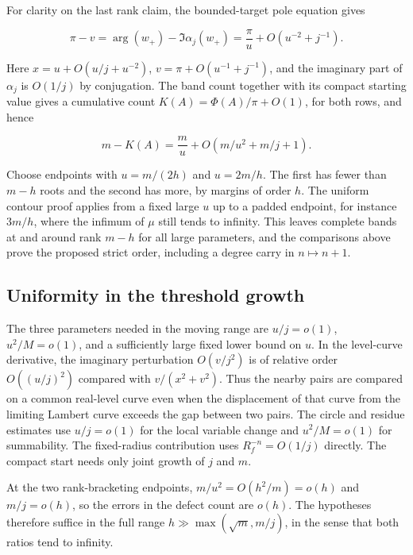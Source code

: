 \documentclass[11pt]{article}
\begin{document}
For clarity on the last rank claim, the bounded-target pole equation gives

\begin{equation*}
\pi-v=\arg(w_+)-\Im\alpha_j(w_+)=\frac{\pi}{u}+O(u^{-2}+j^{-1}).
\end{equation*}

Here \(x=u+O(u/j+u^{-2})\), \(v=\pi+O(u^{-1}+j^{-1})\), and the imaginary part of \(\alpha_j\) is \(O(1/j)\) by conjugation. The band count together with its compact starting value gives a cumulative count \(K(A)=\Phi(A)/\pi+O(1)\), for both rows, and hence

\begin{equation*}
m-K(A)=\frac m u+O(m/u^2+m/j+1).
\end{equation*}

Choose endpoints with \(u=m/(2h)\) and \(u=2m/h\). The first has fewer than \(m-h\) roots and the second has more, by margins of order \(h\). The uniform contour proof applies from a fixed large \(u\) up to a padded endpoint, for instance \(3m/h\), where the infimum of \(\mu\) still tends to infinity. This leaves complete bands at and around rank \(m-h\) for all large parameters, and the comparisons above prove the proposed strict order, including a degree carry in \(n\mapsto n+1\).

\subsection{Uniformity in the threshold growth}
\label{sec:uniformity-in-the-threshold-growth}

The three parameters needed in the moving range are \(u/j=o(1)\), \(u^2/M=o(1)\), and a sufficiently large fixed lower bound on \(u\). In the level-curve derivative, the imaginary perturbation \(O(v/j^2)\) is of relative order \(O((u/j)^2)\) compared with \(v/(x^2+v^2)\). Thus the nearby pairs are compared on a common real-level curve even when the displacement of that curve from the limiting Lambert curve exceeds the gap between two pairs. The circle and residue estimates use \(u/j=o(1)\) for the local variable change and \(u^2/M=o(1)\) for summability. The fixed-radius contribution uses \(R_f^{-n}=O(1/j)\) directly. The compact start needs only joint growth of \(j\) and \(m\).

At the two rank-bracketing endpoints, \(m/u^2=O(h^2/m)=o(h)\) and \(m/j=o(h)\), so the errors in the defect count are \(o(h)\). The hypotheses therefore suffice in the full range \(h\gg\max(\sqrt m,m/j)\), in the sense that both ratios tend to infinity.
\end{document}
